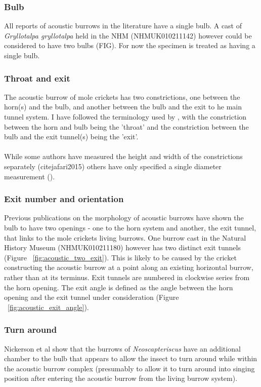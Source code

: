 \documentclass{article}
\begin{document}
   \subsubsection{Bulb}
   All reports of acoustic burrows in the literature have a single bulb. A cast of \textit{Gryllotalpa gryllotalpa} held in the NHM (NHMUK010211142) however could be considered to have two bulbs (FIG). For now the specimen is treated as having a single bulb.
   
   \subsubsection{Throat and exit}
   The acoustic burrow of mole crickets has two constrictions, one between the horn(s) and the bulb, and another between the bulb and the exit to he main tunnel system. I have followed the terminology used by \cite{jafari2015}, with the constriction between the horn and bulb being the 'throat' and the constriction between the bulb and the exit tunnel(s) being the 'exit'.
   
   \paragraph{}
   While some authors have measured the height and width of the constrictions separately (cite{jafari2015}) others have only specified a single diameter measurement (\cite{kavanagh1989}). 
   
   \subsubsection{Exit number and orientation}
   Previous publications on the morphology of acoustic burrows have shown the bulb to have two openings - one to the horn system and another, the exit tunnel, that links to the mole crickets living burrows. One burrow cast in the Natural History Museum (NHMUK010211180) however has two distinct exit tunnels (Figure ~\ref{fig:acoustic_two_exit}). This is likely to be caused by the cricket constructing the acoustic burrow at a point along an existing horizontal burrow, rather than at its terminus.  Exit tunnels are numbered in clockwise series from the horn opening. The exit angle is defined as the angle between the horn opening and the exit tunnel under consideration (Figure ~\ref{fig:acoustic_exit_angle}).
   
   \subsubsection{Turn around}
   Nickerson et al \cite{nickerson1979} show that the burrows of \textit{Neoscapteriscus} have an additional chamber to the bulb that appears to allow the insect to turn around while within the acoustic burrow complex (presumably to allow it to turn around into singing position after entering the acoustic burrow from the living burrow system).
   
\end{document}
